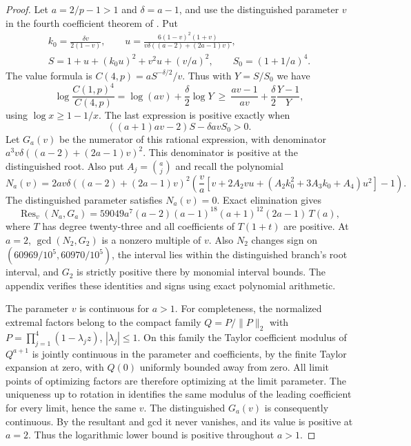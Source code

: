 \documentclass[11pt]{article}
\begin{document}
\begin{proof}
Let \(a=2/p-1>1\) and \(\delta=a-1\), and use the
distinguished parameter \(v\) in the fourth coefficient
theorem of \cite{Low}. Put
\[
\begin{gathered}
 k_0=\frac{\delta v}{2(1-v)},\qquad
 u=\frac{6(1-v)^2(1+v)}{v\delta((a-2)+(2a-1)v)},\\
 S=1+u+(k_0u)^2+v^2u+(v/a)^2,\qquad S_0=(1+1/a)^4 .
 \end{gathered}
\]
The value formula is \(C(4,p)=aS^{-\delta/2}/v\).
Thus with \(Y=S/S_0\) we have
\[
 \log\frac{C(1,p)^4}{C(4,p)}
  =\log(av)+\frac{\delta}{2}\log Y
  \ \geq\ \frac{av-1}{av}+\frac{\delta}{2}\frac{Y-1}{Y},
\]
using \(\log x\ge1-1/x\). The last expression is positive
exactly when
\[
 ((a+1)av-2)S-\delta av S_0>0.
\]
Let \(G_a(v)\) be the numerator of this rational expression,
with denominator \(a^3v\delta((a-2)+(2a-1)v)^2\).
This denominator is positive at the distinguished root.
Also put \(A_j=\binom aj\) and recall the polynomial
\[
 N_a(v)=2av\delta((a-2)+(2a-1)v)^2
  \left(\frac va\left[v+2A_2vu+
           (A_2k_0^2+3A_3k_0+A_4)u^2\right]-1\right).
\]
The distinguished parameter satisfies \(N_a(v)=0\).
Exact elimination gives
\[
 \operatorname{Res}_v(N_a,G_a)
 =59049 a^7(a-2)(a-1)^{18}(a+1)^{12}(2a-1)\,T(a),
\]
where \(T\) has degree twenty-three and all coefficients of
\(T(1+t)\) are positive. At \(a=2\),
\(\gcd(N_2,G_2)\) is a nonzero multiple of \(v\).
Also \(N_2\) changes sign on
\((60969/10^5,60970/10^5)\), the interval lies within the
distinguished branch's root interval, and \(G_2\) is
strictly positive there by monomial interval bounds.
The appendix verifies these identities and signs using
exact polynomial arithmetic.

The parameter \(v\) is continuous for \(a>1\).
For completeness, the normalized extremal factors belong
to the compact family \(Q=P/\|P\|_2\) with
\(P=\prod_{j=1}^4(1-\lambda_jz)\), \(|\lambda_j|\le1\).
On this family the Taylor coefficient modulus of \(Q^{a+1}\)
is jointly continuous in the parameter and coefficients,
by the finite Taylor expansion at zero, with \(Q(0)\)
uniformly bounded away from zero. All limit points of
optimizing factors are therefore optimizing at the limit
parameter. The uniqueness up to rotation in \cite{Low}
identifies the same modulus of the leading coefficient for
every limit, hence the same \(v\). The distinguished
\(G_a(v)\) is consequently continuous. By the resultant
and gcd it never vanishes, and its value is positive at
\(a=2\). Thus the logarithmic lower bound is positive
throughout \(a>1\).
\end{proof}
\end{document}
